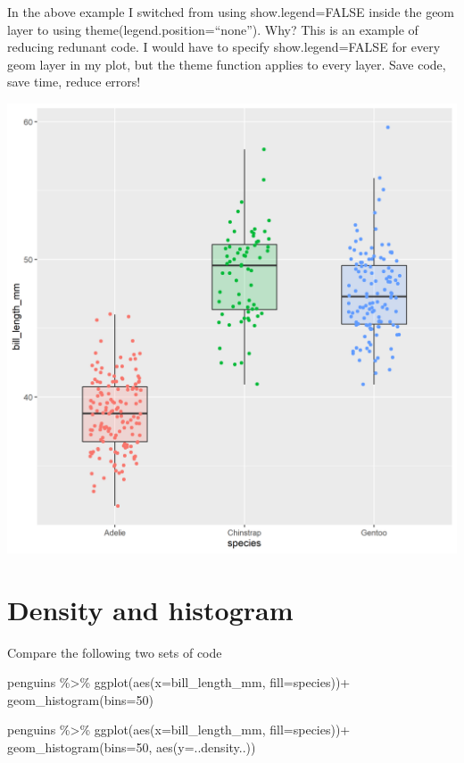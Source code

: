 \documentclass[
]{book}
\makeatletter
\newenvironment{Shaded}{\begin{snugshade}}{\end{snugshade}}
\newcommand{\AttributeTok}[1]{\textcolor[rgb]{0.77,0.63,0.00}{#1}}
\newcommand{\DecValTok}[1]{\textcolor[rgb]{0.00,0.00,0.81}{#1}}
\newcommand{\FunctionTok}[1]{\textcolor[rgb]{0.00,0.00,0.00}{#1}}
\newcommand{\NormalTok}[1]{#1}
\newcommand{\SpecialCharTok}[1]{\textcolor[rgb]{0.00,0.00,0.00}{#1}}
\newenvironment{kframe}{%
\medskip{}
\setlength{\fboxsep}{.8em}
 \def\at@end@of@kframe{}%
 \ifinner\ifhmode%
  \def\at@end@of@kframe{\end{minipage}}%
  \begin{minipage}{\columnwidth}%
 \fi\fi%
 \def\FrameCommand##1{\hskip\@totalleftmargin \hskip-\fboxsep
 \colorbox{shadecolor}{##1}\hskip-\fboxsep
     \hskip-\linewidth \hskip-\@totalleftmargin \hskip\columnwidth}%
 \MakeFramed {\advance\hsize-\width
   \@totalleftmargin\z@ \linewidth\hsize
   \@setminipage}}%
 {\par\unskip\endMakeFramed%
 \at@end@of@kframe}
\newenvironment{block}[1]
  {
  \begin{itemize}
  \renewcommand{\labelitemi}{
    \raisebox{-.7\height}[0pt][0pt]{
      {\setkeys{Gin}{width=3em,keepaspectratio}\texttt{[image: images/\#1]}}
    }
  }
  \setlength{\fboxsep}{1em}
  \begin{kframe}
  \item
  }
  {
  \end{kframe}
  \end{itemize}
  }
\newenvironment{rmdwarning}
  {\begin{block}{warning}}
  {\end{block}}
\makeatother
\begin{document}
\begin{rmdwarning}
In the above example I switched from using show.legend=FALSE inside the
geom layer to using theme(legend.position=``none''). Why? This is an
example of reducing redunant code. I would have to specify
show.legend=FALSE for every geom layer in my plot, but the theme
function applies to every layer. Save code, save time, reduce errors!
\end{rmdwarning}

\includegraphics[width=0.8\linewidth]{images/boxandjitter}

\hypertarget{density-and-histogram}{%
\section{Density and histogram}\label{density-and-histogram}}

Compare the following two sets of code

\begin{Shaded}
\begin{Highlighting}[]
\NormalTok{penguins }\SpecialCharTok{\%\textgreater{}\%} 
    \FunctionTok{ggplot}\NormalTok{(}\FunctionTok{aes}\NormalTok{(}\AttributeTok{x=}\NormalTok{bill\_length\_mm, }\AttributeTok{fill=}\NormalTok{species))}\SpecialCharTok{+}
    \FunctionTok{geom\_histogram}\NormalTok{(}\AttributeTok{bins=}\DecValTok{50}\NormalTok{)}
\end{Highlighting}
\end{Shaded}

\begin{Shaded}
\begin{Highlighting}[]
\NormalTok{penguins }\SpecialCharTok{\%\textgreater{}\%} 
    \FunctionTok{ggplot}\NormalTok{(}\FunctionTok{aes}\NormalTok{(}\AttributeTok{x=}\NormalTok{bill\_length\_mm, }\AttributeTok{fill=}\NormalTok{species))}\SpecialCharTok{+}
    \FunctionTok{geom\_histogram}\NormalTok{(}\AttributeTok{bins=}\DecValTok{50}\NormalTok{, }\FunctionTok{aes}\NormalTok{(}\AttributeTok{y=}\NormalTok{..density..))}
\end{Highlighting}
\end{Shaded}
\end{document}

